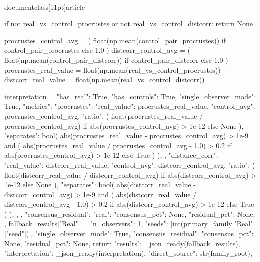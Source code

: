 \\documentclass[11pt]{article}
\begin{document}
\begin{CodeBlock}
        if not real_vs_control_procrustes or not real_vs_control_distcorr:
            return None

        procrustes_control_avg = (
            float(np.mean(control_pair_procrustes))
            if control_pair_procrustes
            else 1.0
        )
        distcorr_control_avg = (
            float(np.mean(control_pair_distcorr))
            if control_pair_distcorr
            else 1.0
        )
        procrustes_real_value = float(np.mean(real_vs_control_procrustes))
        distcorr_real_value = float(np.mean(real_vs_control_distcorr))

        interpretation = {
            "has_real": True,
            "has_controls": True,
            "single_observer_mode": True,
            "metrics": {
                "procrustes": {
                    "real_value": procrustes_real_value,
                    "control_avg": procrustes_control_avg,
                    "ratio": (
                        float(procrustes_real_value / procrustes_control_avg)
                        if abs(procrustes_control_avg) > 1e-12
                        else None
                    ),
                    "separates": bool(
                        abs(procrustes_real_value - procrustes_control_avg) > 1e-9
                        and (
                            abs(procrustes_real_value / procrustes_control_avg - 1.0) > 0.2
                            if abs(procrustes_control_avg) > 1e-12
                            else True
                        )
                    ),
                },
                "distance_corr": {
                    "real_value": distcorr_real_value,
                    "control_avg": distcorr_control_avg,
                    "ratio": (
                        float(distcorr_real_value / distcorr_control_avg)
                        if abs(distcorr_control_avg) > 1e-12
                        else None
                    ),
                    "separates": bool(
                        abs(distcorr_real_value - distcorr_control_avg) > 1e-9
                        and (
                            abs(distcorr_real_value / distcorr_control_avg - 1.0) > 0.2
                            if abs(distcorr_control_avg) > 1e-12
                            else True
                        )
                    ),
                },
            },
            "consensus_residual": {
                "real": {
                    "consensus_pct": None,
                    "residual_pct": None,
                }
            },
        }
        fallback_results["Real"] = {
            "n_observers": 1,
            "seeds": [int(primary_family["Real"]["seed"])],
            "single_observer_mode": True,
            "consensus_residual": {"consensus_pct": None, "residual_pct": None},
        }
        return {
            "results": _json_ready(fallback_results),
            "interpretation": _json_ready(interpretation),
            "direct_source": str(family_root),
        }


\end{CodeBlock}
\end{document}

